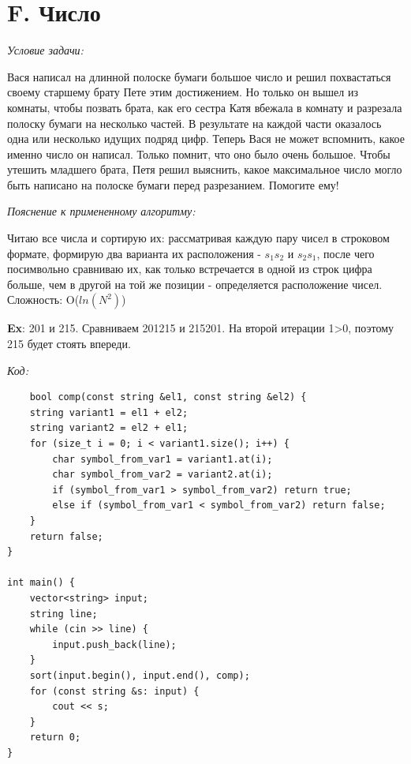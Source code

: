 \section{F. Число}
\textit{Условие задачи:} \par
Вася написал на длинной полоске бумаги большое число и решил похвастаться своему старшему брату Пете этим достижением.
Но только он вышел из комнаты, чтобы позвать брата, как его сестра Катя вбежала в комнату и разрезала полоску бумаги на
несколько частей. В результате на каждой части оказалось одна или несколько идущих подряд цифр.
Теперь Вася не может вспомнить, какое именно число он написал. Только помнит, что оно было очень большое. Чтобы утешить
младшего брата, Петя решил выяснить, какое максимальное число могло быть написано на полоске бумаги перед разрезанием. Помогите ему! \par
\textit{Пояснение к примененному алгоритму:} \par
Читаю все числа и сортирую их: рассматривая каждую пару чисел в строковом формате, формирую два варианта их расположения - $s_1$$s_2$ и $s_2$$s_1$,
после чего посимвольно сравниваю их, как только встречается в одной из строк цифра больше, чем в другой на той же позиции - определяется расположение чисел.
Сложность: O($ln(N^2)$)\par
\textbf{Ex}: 201 и 215. Сравниваем 201215 и 215201. На второй итерации 1>0, поэтому 215 будет стоять впереди.\par
\textit{Код:}
\small
\begin{center}
  \begin{verbatim}
    bool comp(const string &el1, const string &el2) {
    string variant1 = el1 + el2;
    string variant2 = el2 + el1;
    for (size_t i = 0; i < variant1.size(); i++) {
        char symbol_from_var1 = variant1.at(i);
        char symbol_from_var2 = variant2.at(i);
        if (symbol_from_var1 > symbol_from_var2) return true;
        else if (symbol_from_var1 < symbol_from_var2) return false;
    }
    return false;
}

int main() {
    vector<string> input;
    string line;
    while (cin >> line) {
        input.push_back(line);
    }
    sort(input.begin(), input.end(), comp);
    for (const string &s: input) {
        cout << s;
    }
    return 0;
}

  \end{verbatim}
\end{center}
\normalsize
\BgThispage
\newpage


